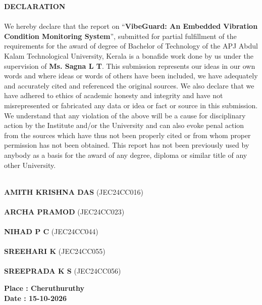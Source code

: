 \linespread{1}
\begin{center}
\textbf{\fontsize{16}{32}\selectfont DECLARATION}\\
\end{center}
\fontsize{12}{22}\selectfont
\paragraph*{}We hereby declare that the report on ``\textbf{VibeGuard: An Embedded Vibration Condition Monitoring System}'', submitted for partial fulfillment of the requirements for the award of degree of Bachelor of Technology of the APJ Abdul Kalam Technological University, Kerala is a bonafide work done by us under the supervision of \textbf{Ms. Sagna L T}. This submission represents our ideas in our own words and where ideas or words of others have been included, we have adequately and accurately cited and referenced the original sources. We also declare that we have adhered to ethics of academic honesty and integrity and have not misrepresented or fabricated any data or idea or fact or source in this submission. We understand that any violation of the above will be a cause for disciplinary action by the Institute and/or the University and can also evoke penal action from the sources which have thus not been properly cited or from whom proper permission has not been obtained. This report has not been previously used by anybody as a basis for the award of any degree, diploma or similar title of any other University.

\vspace{2.5em}

\noindent
\begin{minipage}[t]{0.55\textwidth}
\underline{\hspace{4.8cm}}\\
\textbf{AMITH KRISHNA DAS} (JEC24CC016)\\[0.45cm]
\underline{\hspace{4.8cm}}\\
\textbf{ARCHA PRAMOD} (JEC24CC023)\\[0.45cm]
\underline{\hspace{4.8cm}}\\
\textbf{NIHAD P C} (JEC24CC044)\\[0.45cm]
\underline{\hspace{4.8cm}}\\
\textbf{SREEHARI K} (JEC24CC055)\\[0.45cm]
\underline{\hspace{4.8cm}}\\
\textbf{SREEPRADA K S} (JEC24CC056)
\end{minipage}
\hfill
\begin{minipage}[t]{0.40\textwidth}
\vspace{3.8cm}
\raggedleft
\textbf{Place : Cheruthuruthy}\\[0.4cm]
\textbf{Date : 15-10-2026}
\end{minipage}

\thispagestyle{empty}
\clearpage
